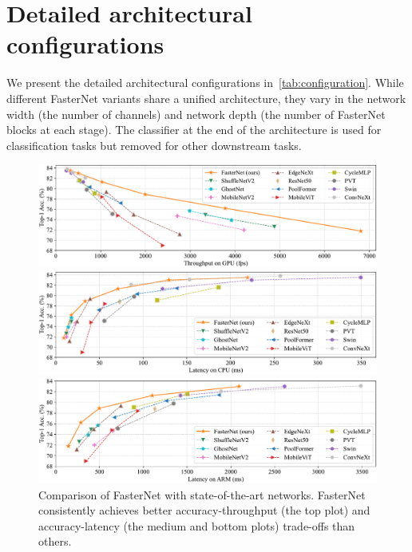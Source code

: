 \section{Detailed architectural configurations}
We present the detailed architectural configurations in~\cref{tab:configuration}. While different FasterNet variants share a unified architecture, they vary in the network width (the number of channels) and network depth (the number of FasterNet blocks at each stage). The classifier at the end of the architecture is used for classification tasks but removed for other downstream tasks. 




\begin{figure}
    \centering
    \includegraphics[width=1.\linewidth]{figures/fps_latency_gpu-cropped.pdf}

    \includegraphics[width=1.\linewidth]{figures/acc_latency_cpu-cropped.pdf}
    
    \includegraphics[width=1.\linewidth]{figures/acc_latency_arm-cropped.pdf}
    
    \vspace{-0.1in}
    \caption{Comparison of FasterNet with state-of-the-art networks. FasterNet consistently achieves better accuracy-throughput (the top plot) and accuracy-latency (the medium and bottom plots) trade-offs than others.}
    \label{fig:imagenet_full}
\end{figure}

